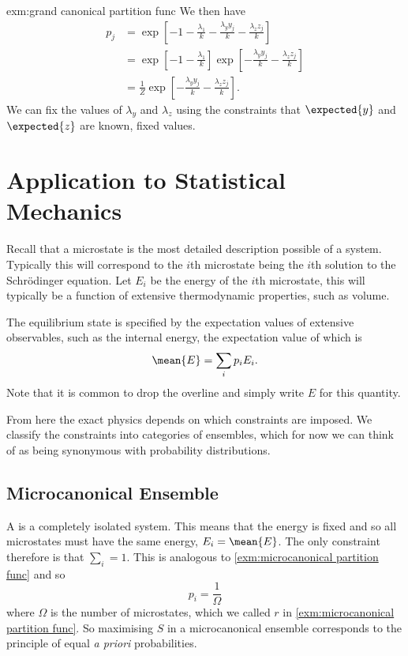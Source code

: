 \documentclass[fleqn]{NotesClass}
\begin{document}
\begin{exm}{}{exm:grand canonical partition func}
        We then have
        \begin{align}
            p_j &= \exp\left[ -1 - \frac{\lambda_1}{k} - \frac{\lambda_y y_j}{k} - \frac{\lambda_z z_j}{k} \right]\\
            &= \exp\left[ -1 - \frac{\lambda_1}{k} \right]\exp\left[ -\frac{\lambda_y y_j}{k} - \frac{\lambda_z z_j}{k} \right]\\
            &= \frac{1}{Z}\exp\left[ -\frac{\lambda_y y_j}{k} - \frac{\lambda_z z_j}{k} \right].
        \end{align}
        We can fix the values of \(\lambda_y\) and \(\lambda_z\) using the constraints that \(\expected{y}\) and \(\expected{z}\) are known, fixed values.
    \end{exm}
    
    \section{Application to Statistical Mechanics}
    Recall that a microstate is the most detailed description possible of a system.
    Typically this will correspond to the \(i\)th microstate being the \(i\)th solution to the Schrödinger equation.
    Let \(E_i\) be the energy of the \(i\)th microstate, this will typically be a function of extensive thermodynamic properties, such as volume.
    
    The equilibrium state is specified by the expectation values of extensive observables, such as the internal energy, the expectation value of which is
    \begin{equation}
        \mean{E} = \sum_{i} p_i E_i.
    \end{equation}
    Note that it is common to drop the overline and simply write \(E\) for this quantity.
    
    From here the exact physics depends on which constraints are imposed.
    We classify the constraints into categories of ensembles, which for now we can think of as being synonymous with probability distributions.
    
    \subsection{Microcanonical Ensemble}
    A  is a completely isolated system.
    This means that the energy is fixed and so all microstates must have the same energy, \(E_i = \mean{E}\).
    The only constraint therefore is that \(\sum_i = 1\).
    This is analogous to \cref{exm:microcanonical partition func} and so
    \begin{equation}
        p_i = \frac{1}{\Omega}
    \end{equation}
    where \(\Omega\) is the number of microstates, which we called \(r\) in \cref{exm:microcanonical partition func}.
    So maximising \(S\) in a microcanonical ensemble corresponds to the principle of equal \textit{a priori} probabilities.
    
\end{document}
